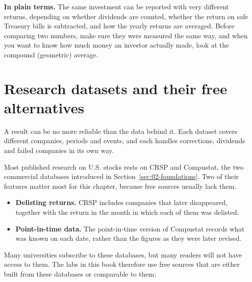 \noindent\textbf{In plain terms.} The same investment can be reported with very different returns, depending on whether dividends are counted, whether the return on safe Treasury bills is subtracted, and how the yearly returns are averaged. Before comparing two numbers, make sure they were measured the same way, and when you want to know how much money an investor actually made, look at the compound (geometric) average.

\section{Research datasets and their free alternatives}
\label{sec:02-datasets}

A result can be no more reliable than the data behind it. Each dataset covers different companies, periods and events, and each handles corrections, dividends and failed companies in its own way. 

Most published research on U.S. stocks rests on CRSP and Compustat, the two commercial databases introduced in Section~\ref{sec:02-foundations}. Two of their features matter most for this chapter, because free sources usually lack them.

\begin{itemize}
  \item \textbf{Delisting returns.} CRSP includes companies that later disappeared, together with the return in the month in which each of them was delisted.
  \item \textbf{Point-in-time data.} The point-in-time version of Compustat records what was known on each date, rather than the figures as they were later revised.
\end{itemize}

Many universities subscribe to these databases, but many readers will not have access to them. The labs in this book therefore use free sources that are either built from these databases or comparable to them:

